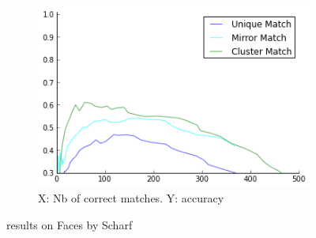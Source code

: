\documentclass{article}
\begin{document}
\begin{figure}
{\begin{subfigure}[t]{0.35\textwidth}
			\label{fig:faces2}
		\end{subfigure}%
		~ %
		\begin{subfigure}[t]{0.35\textwidth}
			\centering
			\includegraphics[width=\textwidth]{images/result_scharf}
			\caption{X: Nb of correct matches. Y: accuracy}
			\label{fig:result_faces}
		\end{subfigure}%
	}%
	\label{fig:faces}
	\caption{results on Faces by Scharf}
\end{figure}
\end{document}
